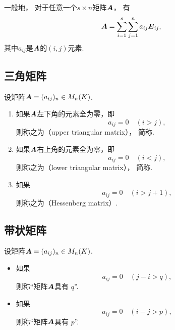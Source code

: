 一般地，
对于任意一个\(s \times n\)矩阵\(\boldsymbol{A}\)，
有\begin{equation*}
	\boldsymbol{A} = \sum_{i=1}^s \sum_{j=1}^n a_{ij} \boldsymbol{E}_{ij},
\end{equation*}
其中\(a_{ij}\)是\(\boldsymbol{A}\)的\((i,j)\)元素.

\subsection{三角矩阵}
\begin{definition}
设矩阵\(\boldsymbol{A}=(a_{ij})_n \in M_n(K)\).
\begin{enumerate}
	\item 如果\(\boldsymbol{A}\)左下角的元素全为零，即\begin{equation*}
		a_{ij} = 0
		\quad(i>j),
	\end{equation*}
	则称之为（upper triangular matrix），
	简称.

	\item 如果\(\boldsymbol{A}\)右上角的元素全为零，即\begin{equation*}
		a_{ij} = 0
		\quad(i<j),
	\end{equation*}
	则称之为（lower triangular matrix），
	简称.

	\item 如果\begin{equation*}
		a_{ij} = 0
		\quad(i>j+1),
	\end{equation*}
	则称之为（Hessenberg matrix）.
\end{enumerate}
\end{definition}

\subsection{带状矩阵}
\begin{definition}
设矩阵\(\boldsymbol{A}=(a_{ij})_n \in M_n(K)\).
\begin{itemize}
	\item 如果\begin{equation*}
		a_{ij} = 0
		\quad(j-i>q),
	\end{equation*}
	则称“矩阵\(\boldsymbol{A}\)具有 \(q\)”.

	\item 如果\begin{equation*}
		a_{ij} = 0
		\quad(i-j>p),
	\end{equation*}
	则称“矩阵\(\boldsymbol{A}\)具有 \(p\)”.
\end{itemize}
\end{definition}

